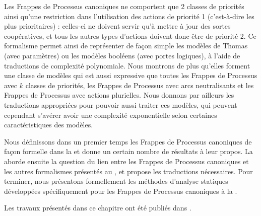 Les Frappes de Processus canoniques
ne comportent que 2 classes de priorités ainsi qu'une restriction dans
l'utilisation des actions de priorité 1 (c'est-à-dire les plus prioritaires) :
celles-ci ne doivent servir qu'à mettre à jour des sortes coopératives,
et tous les autres types d'actions doivent donc être de priorité 2.
Ce formalisme permet ainsi de représenter de façon simple les modèles de Thomas (avec paramètres)
ou les modèles booléens (avec portes logiques),
à l'aide de traductions de complexité polynomiale.
Nous montrons de plus qu'elles forment une classe de modèles qui est aussi expressive
que toutes les Frappes de Processus avec $k$ classes de priorités,
les Frappes de Processus avec arcs neutralisants
et les Frappes de Processus avec actions plurielles.
Nous donnons par ailleurs les traductions appropriées pour pouvoir aussi traiter ces modèles,
qui peuvent cependant s'avérer avoir une complexité exponentielle
selon certaines caractéristiques des modèles.

\myskip

Nous définissons dans un premier temps les Frappes de Processus canoniques
de façon formelle dans la 
et donne un certain nombre de résultats à leur propos.
La  aborde ensuite
la question du lien entre les Frappes de Processus canoniques
et les autres formalismes présentés au ,
et propose les traductions nécessaires.
Pour terminer, nous présentons formellement
les méthodes d'analyse statiques développées spécifiquement
pour les Frappes de Processus canoniques à la .

Les travaux présentés dans ce chapitre ont été publiés dans
\cite*{FPMR13-CS2Bio}.



% 






